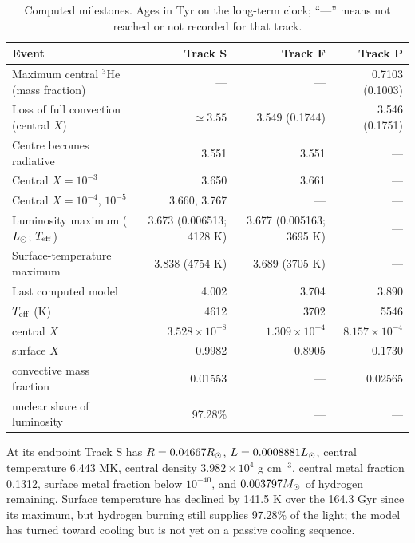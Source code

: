 \begin{table}[H]\centering\small
\caption{Computed milestones. Ages in Tyr on the long-term clock; ``---''
means not reached or not recorded for that track.}\label{tab:milestones}
\begin{tabular}{@{}lrrr@{}}\toprule
Event & Track S & Track F & Track P \\\midrule
Maximum central $^3$He (mass fraction) & --- & --- & 0.7103 (0.1003) \\
Loss of full convection (central $X$) & $\simeq3.55$ & 3.549 (0.1744) & 3.546 (0.1751) \\
Centre becomes radiative & 3.551 & 3.551 & --- \\
Central $X=10^{-3}$ & 3.650 & 3.661 & --- \\
Central $X=10^{-4}$, $10^{-5}$ & 3.660, 3.767 & --- & --- \\
Luminosity maximum ($L_\odot$; $T_{\rm eff}$) & 3.673 (0.006513; 4128 K) & 3.677 (0.005163; 3695 K) & --- \\
Surface-temperature maximum & 3.838 (4754 K) & 3.689 (3705 K) & --- \\
Last computed model & 4.002 & 3.704 & 3.890 \\
\quad $T_{\rm eff}$ (K) & 4612 & 3702 & 5546 \\
\quad central $X$ & $3.528\times10^{-8}$ & $1.309\times10^{-4}$ & $8.157\times10^{-4}$ \\
\quad surface $X$ & 0.9982 & 0.8905 & 0.1730 \\
\quad convective mass fraction & 0.01553 & --- & 0.02565 \\
\quad nuclear share of luminosity & 97.28\% & --- & --- \\\bottomrule
\end{tabular}
\end{table}

At its endpoint Track S has $R=0.04667R_\odot$, $L=0.0008881L_\odot$, central
temperature 6.443 MK, central density $3.982\times10^4$ g cm$^{-3}$,
central metal fraction 0.1312, surface metal fraction below $10^{-40}$,
and $0.003797M_\odot$ of hydrogen remaining. Surface temperature has declined
by 141.5 K over the 164.3 Gyr since its maximum, but hydrogen burning still
supplies 97.28\% of the light; the model has turned toward cooling but is
not yet on a passive cooling sequence.


